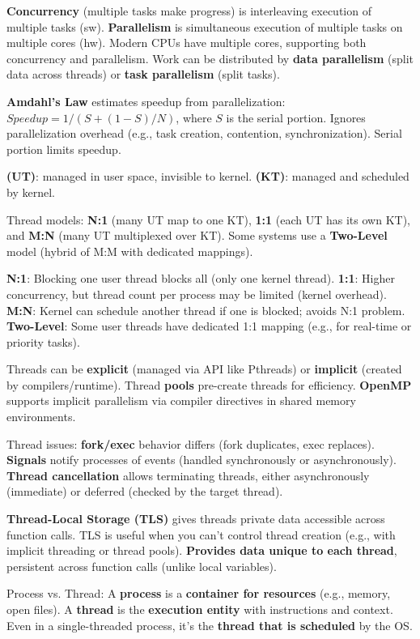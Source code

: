 \textbf{Concurrency} (multiple tasks make progress) is interleaving execution of multiple tasks (sw). \textbf{Parallelism} is simultaneous execution of multiple tasks on multiple cores (hw). Modern CPUs have multiple cores, supporting both concurrency and parallelism. Work can be distributed by \textbf{data parallelism} (split data across threads) or \textbf{task parallelism} (split tasks).

\textbf{Amdahl's Law} estimates speedup from parallelization: $Speedup = 1 / (S + (1-S)/N)$, where $S$ is the serial portion.
Ignores parallelization overhead (e.g., task creation, contention, synchronization).
Serial portion limits speedup.

\textbf{(UT)}: managed in user space, invisible to kernel.
\textbf{(KT)}: managed and scheduled by kernel.

Thread models: \textbf{N:1} (many UT map to one KT), \textbf{1:1} (each UT has its own KT), and \textbf{M:N} (many UT multiplexed over KT). Some systems use a \textbf{Two-Level} model (hybrid of M:M with dedicated mappings).

\textbf{N:1}: Blocking one user thread blocks all (only one kernel thread).
\textbf{1:1}: Higher concurrency, but thread count per process may be limited (kernel overhead).
\textbf{M:N}: Kernel can schedule another thread if one is blocked; avoids N:1 problem.
\textbf{Two-Level}: Some user threads have dedicated 1:1 mapping (e.g., for real-time or priority tasks).


Threads can be \textbf{explicit} (managed via API like Pthreads) or \textbf{implicit} (created by compilers/runtime). Thread \textbf{pools} pre-create threads for efficiency. \textbf{OpenMP} supports implicit parallelism via compiler directives in shared memory environments.

Thread issues: \textbf{fork/exec} behavior differs (fork duplicates, exec replaces). \textbf{Signals} notify processes of events (handled synchronously or asynchronously). \textbf{Thread cancellation} allows terminating threads, either asynchronously (immediate) or deferred (checked by the target thread).

\textbf{Thread-Local Storage (TLS)} gives threads private data accessible across function calls.
TLS is useful when you can't control thread creation (e.g., with implicit threading or thread pools).
\textbf{Provides data unique to each thread}, persistent across function calls (unlike local variables).


Process vs. Thread:
A \textbf{process} is a \textbf{container for resources} (e.g., memory, open files).
A \textbf{thread} is the \textbf{execution entity} with instructions and context.
Even in a single-threaded process, it's the \textbf{thread that is scheduled} by the OS.

